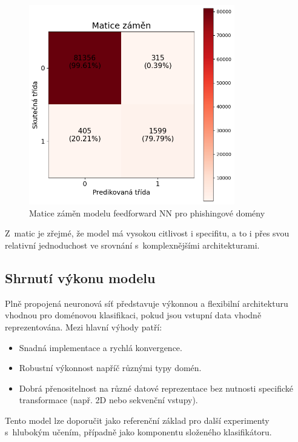 \begin{figure}[H]
\centering
\includegraphics[width=0.8\textwidth]{obrazky-figures/feedforward_stage_3_phishing_v1.1_confusion_matrix.png}
\caption{Matice záměn modelu feedforward NN pro phishingové domény}
\label{fig:ffnn_conf_matrix_phishing}
\end{figure}

Z~matic je zřejmé, že model má vysokou citlivost i specifitu, a to i přes svou relativní jednoduchost ve srovnání s~komplexnějšími architekturami.

\subsection{Shrnutí výkonu modelu}

Plně propojená neuronová síť představuje výkonnou a flexibilní architekturu vhodnou pro doménovou klasifikaci, pokud jsou vstupní data vhodně reprezentována. Mezi hlavní výhody patří:
\begin{itemize}
    \item Snadná implementace a rychlá konvergence.
    \item Robustní výkonnost napříč různými typy domén.
    \item Dobrá přenositelnost na různé datové reprezentace bez nutnosti specifické transformace (např. 2D nebo sekvenční vstupy).
\end{itemize}

Tento model lze doporučit jako referenční základ pro další experimenty s~hlubokým učením, případně jako komponentu složeného klasifikátoru.



